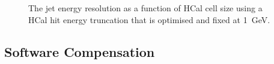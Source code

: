 \begin{figure}[h!]
\caption[The jet energy resolution as a function of HCal cell size using a HCal hit energy truncation that is \protect{} optimised and \protect{} fixed at 1~GeV.]{The jet energy resolution as a function of HCal cell size using a HCal hit energy truncation that is \protect{} optimised and \protect{} fixed at 1~GeV.}
\label{fig:jerhcalcellopt}
\end{figure}


\subsection{Software Compensation}
\label{sec:softcomp}
